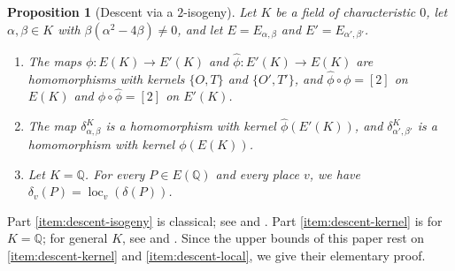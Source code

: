 \documentclass[12pt,oneside,openany]{book}
\theoremstyle{definition}
\theoremstyle{plain}
\numberwithin{equation}{chapter}
\theoremstyle{plain}
\newtheorem{proposition}[proposition]{Proposition}
\theoremstyle{definition}
\theoremstyle{remark}
\newcommand{\Q}{\mathbb Q}
\newcommand{\dual}{\hat\phi}
\begin{document}
\begin{proposition}[Descent via a $2$-isogeny]\label{prop:descent}
Let $K$ be a field of characteristic $0$, let $\alpha,\beta\in K$ with $\beta(\alpha^2-4\beta)\ne0$, and let $E=E_{\alpha,\beta}$ and $E'=E_{\alpha',\beta'}$.
\begin{enumerate}[label=(\alph*),ref=(\alph*)]
\item\label{item:descent-isogeny} The maps $\phi\colon E(K)\to E'(K)$ and $\dual\colon E'(K)\to E(K)$ are homomorphisms with kernels $\{O,T\}$ and $\{O',T'\}$, and $\dual\circ\phi=[2]$ on $E(K)$ and $\phi\circ\dual=[2]$ on $E'(K)$.
\item\label{item:descent-kernel} The map $\delta^K_{\alpha,\beta}$ is a homomorphism with kernel $\dual(E'(K))$, and $\delta^K_{\alpha',\beta'}$ is a homomorphism with kernel $\phi(E(K))$.
\item\label{item:descent-local} Let $K=\Q$. For every $P\in E(\Q)$ and every place $v$, we have $\delta_v(P)=\operatorname{loc}_v(\delta(P))$.
\end{enumerate}
\end{proposition}

Part \ref{item:descent-isogeny} is classical; see \cite[Section~3.4]{SilvermanTate2015} and \cite[Example~III.4.5 and Theorem~III.4.8]{SilvermanAEC}. Part \ref{item:descent-kernel} is \cite[Proposition~3.8]{SilvermanTate2015} for $K=\Q$; for general $K$, see \cite[Example~X.4.8 and Proposition~X.4.9]{SilvermanAEC} and \cite[Section~3.1]{Zywina2026}. Since the upper bounds of this paper rest on \ref{item:descent-kernel} and \ref{item:descent-local}, we give their elementary proof.
\end{document}
